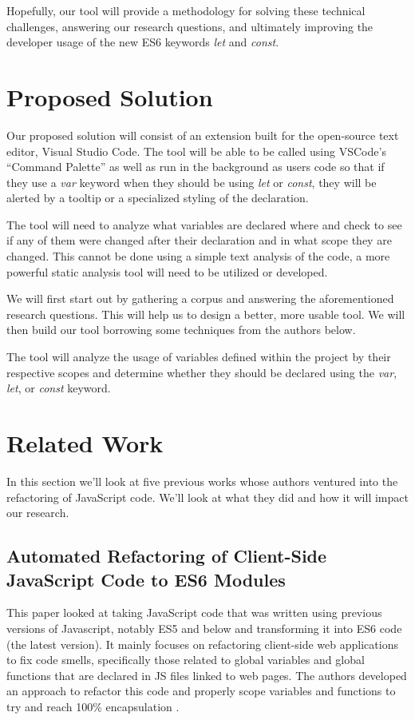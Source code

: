 \documentclass{sig-alternate}
\begin{document}
Hopefully, our tool will provide a methodology for solving these technical challenges, answering our research questions, and ultimately improving the developer usage of the new ES6 keywords \textit{let} and \textit{const}. 

\section{Proposed Solution}
Our proposed solution will consist of an extension built for the open-source text editor, Visual Studio Code.
The tool will be able to be called using VSCode's ``Command Palette'' as well as run in the background as users code so that if they use a \textit{var} keyword when they should be using \textit{let} or \textit{const}, they will be alerted by a tooltip or a specialized styling of the declaration.

The tool will need to analyze what variables are declared where and check to see if any of them were changed after their declaration and in what scope they are changed.
This cannot be done using a simple text analysis of the code, a more powerful static analysis tool will need to be utilized or developed.

We will first start out by gathering a corpus and answering the aforementioned research questions.
This will help us to design a better, more usable tool.
We will then build our tool borrowing some techniques from the authors below.

The tool will analyze the usage of variables defined within the project by their respective scopes and determine whether they should be declared using the \textit{var}, \textit{let}, or \textit{const} keyword.

\section{Related Work}
In this section we'll look at five previous works whose authors ventured into the refactoring of JavaScript code.
We'll look at what they did and how it will impact our research.

\subsection{Automated Refactoring of Client-Side\\ JavaScript Code to ES6 Modules}
This paper looked at taking JavaScript code that was written using previous versions of Javascript, notably ES5 and below and transforming it into ES6 code (the latest version).
It mainly focuses on refactoring client-side web applications to fix code smells, specifically those related to global variables and global functions that are declared in JS files linked to web pages.
The authors developed an approach to refactor this code and properly scope variables and functions to try and reach 100\% encapsulation \cite{es6}. 
\end{document}
